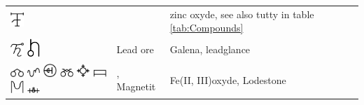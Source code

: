 \documentclass[british,final,landscape]{scrartcl}
\begin{document}
\begin{refsection}
\begin{supertabular}{p{0.3\textwidth}p{0.34\textwidth}p{0.34\textwidth}}
   \includegraphics[width=5mm]{Mineral/LapisTutiae} &  & zinc oxyde, see also tutty in table \ref{tab:Compounds} \\
   \includegraphics[width=5mm]{Mineral/LeadOre} \includegraphics[width=5mm]{Mineral/LeadOre2} & Lead ore & Galena, leadglance  \\
   \includegraphics[width=5mm]{Mineral/Magnetit} \includegraphics[width=5mm]{Mineral/Magnetit2} \includegraphics[width=5mm]{Mineral/Magnetit3} \includegraphics[width=5mm]{Mineral/Magnetit4} \includegraphics[width=5mm]{Mineral/Magnetit5} \includegraphics[width=5mm]{Mineral/Magnetit6} \includegraphics[width=5mm]{Mineral/Magnetit7} \includegraphics[width=5mm]{Mineral/Magnetit8} & , Magnetit & Fe(II, III)oxyde, Lodestone  \\

\end{supertabular}
\end{refsection}
\end{document}
